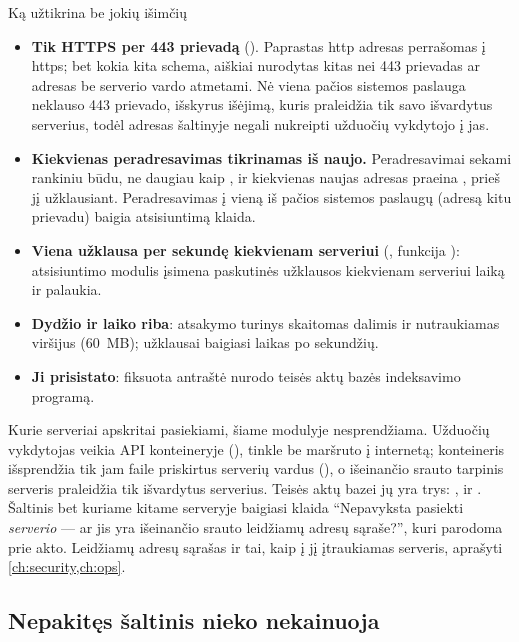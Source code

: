 \begin{codebox}{Ką  užtikrina be jokių išimčių}
\begin{itemize}
  \item \textbf{Tik HTTPS per 443 prievadą} (). Paprastas http adresas
    perrašomas į https; bet kokia kita schema, aiškiai nurodytas kitas nei 443 prievadas ar
    adresas be serverio vardo atmetami. Nė viena pačios sistemos paslauga neklauso 443
    prievado, išskyrus išėjimą, kuris praleidžia tik savo išvardytus serverius, todėl adresas
    šaltinyje negali nukreipti užduočių vykdytojo į jas.
  \item \textbf{Kiekvienas peradresavimas tikrinamas iš naujo.} Peradresavimai sekami
    rankiniu būdu, ne daugiau kaip , ir kiekvienas naujas adresas
    praeina , prieš jį užklausiant. Peradresavimas į vieną iš pačios sistemos
    paslaugų (adresą kitu prievadu) baigia atsisiuntimą klaida.
  \item \textbf{Viena užklausa per sekundę kiekvienam serveriui} (,
    funkcija ): atsisiuntimo modulis įsimena paskutinės užklausos kiekvienam
    serveriui laiką ir palaukia.
  \item \textbf{Dydžio ir laiko riba}: atsakymo turinys skaitomas dalimis ir nutraukiamas
    viršijus  (60~MB); užklausai baigiasi laikas po 
    sekundžių.
  \item \textbf{Ji prisistato}: fiksuota  antraštė nurodo teisės aktų bazės
    indeksavimo programą.
\end{itemize}
\end{codebox}

Kurie serveriai apskritai pasiekiami, šiame modulyje nesprendžiama. Užduočių vykdytojas veikia
API konteineryje (), tinkle be maršruto į internetą; konteineris
išsprendžia tik jam  faile priskirtus serverių vardus
(), o išeinančio srauto tarpinis serveris praleidžia tik
 išvardytus serverius. Teisės aktų bazei jų yra trys:
,  ir . Šaltinis bet kuriame
kitame serveryje baigiasi klaida \enquote{Nepavyksta pasiekti \emph{serverio} --- ar jis yra
išeinančio srauto leidžiamų adresų sąraše?}, kuri parodoma prie akto. Leidžiamų adresų sąrašas
ir tai, kaip į jį įtraukiamas serveris, aprašyti \cref{ch:security,ch:ops}.

\subsection{Nepakitęs šaltinis nieko nekainuoja}\label{sec:corpus:unchanged}


